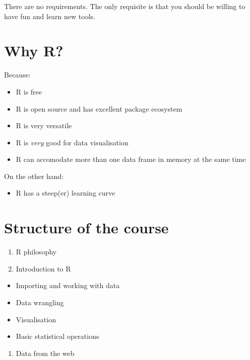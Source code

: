 \documentclass[11pt,]{article}
\providecommand{\tightlist}{%
  \setlength{\itemsep}{0pt}\setlength{\parskip}{0pt}}
\begin{document}
There are no requirements. The only requisite is that you should be
willing to have fun and learn new tools.

\hypertarget{why-r}{%
\section{Why R?}\label{why-r}}

Because:

\begin{itemize}
\tightlist
\item
  R is free
\item
  R is open source and has excellent package ecosystem
\item
  R is very versatile
\item
  R is \emph{very} good for data visualisation
\item
  R can accomodate more than one data frame in memory at the same time
\end{itemize}

On the other hand:

\begin{itemize}
\tightlist
\item
  R has a steep(er) learning curve
\end{itemize}

\hypertarget{structure-of-the-course}{%
\section{Structure of the course}\label{structure-of-the-course}}

\begin{enumerate}
\def\labelenumi{\arabic{enumi}.}
\item
  R philosophy
\item
  Introduction to R
\end{enumerate}

\begin{itemize}
\tightlist
\item
  Importing and working with data
\item
  Data wrangling
\item
  Visualisation
\item
  Basic statistical operations
\end{itemize}

\begin{enumerate}
\def\labelenumi{\arabic{enumi}.}
\setcounter{enumi}{2}
\tightlist
\item
  Data from the web
\end{enumerate}
\end{document}
